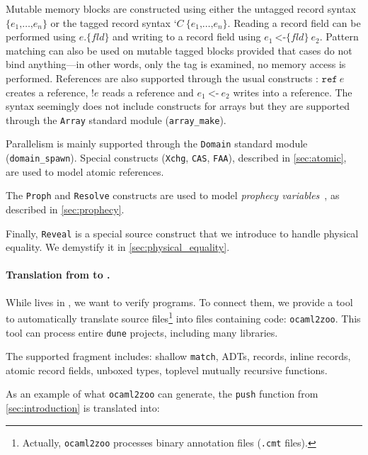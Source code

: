 Mutable memory blocks are constructed using either the untagged record syntax $\texttt{\{} e_1 \texttt{,} \dots \texttt{,} e_n \texttt{\}}$ or the tagged record syntax $\texttt{‘} C\ \texttt{\{} e_1 \texttt{,} \dots \texttt{,} e_n \texttt{\}}$.
Reading a record field can be performed using $e \texttt{.\{} \mathit{fld} \texttt{\}}$ and writing to a record field using $e_1\ \texttt{<-\{} \mathit{fld} \texttt{\}}\ e_2$.
Pattern matching can also be used on mutable tagged blocks provided that cases do not bind anything---in other words, only the tag is examined, no memory access is performed.
References are also supported through the usual constructs : $\texttt{ref}\ e$ creates a reference, $\texttt{!} e$ reads a reference and $e_1\ \texttt{<-}\ e_2$ writes into a reference.
The syntax seemingly does not include constructs for arrays but they are supported through the \texttt{Array} standard module (\eg \texttt{array\_make}).

Parallelism is mainly supported through the \texttt{Domain} standard module (\eg \texttt{domain\_spawn}).
Special constructs (\texttt{Xchg}, \texttt{CAS}, \texttt{FAA}), described in \cref{sec:atomic}, are used to model atomic references.

The \texttt{Proph} and \texttt{Resolve} constructs are used to model \emph{prophecy variables}~\cite{DBLP:journals/pacmpl/JungLPRTDJ20}, as described in \cref{sec:prophecy}.

Finally, \texttt{Reveal} is a special source construct that we introduce to handle physical equality.
We demystify it in \cref{sec:physical_equality}.

\paragraph{Translation from \OCaml to \ZooLang.}

While \ZooLang lives in \Rocq, we want to verify \OCaml programs.
To connect them, we provide a tool to automatically translate \OCaml source files\footnote{Actually, \texttt{ocaml2zoo} processes binary annotation files (\texttt{.cmt} files).} into \Rocq files containing \ZooLang code: \texttt{ocaml2zoo}.
This tool can process entire \texttt{dune} projects, including many libraries.

The supported \OCaml fragment includes: shallow \texttt{match}, ADTs, records, inline records, atomic record fields, unboxed types, toplevel mutually recursive functions.

As an example of what \texttt{ocaml2zoo} can generate, the \texttt{push} function from \cref{sec:introduction} is translated into:

